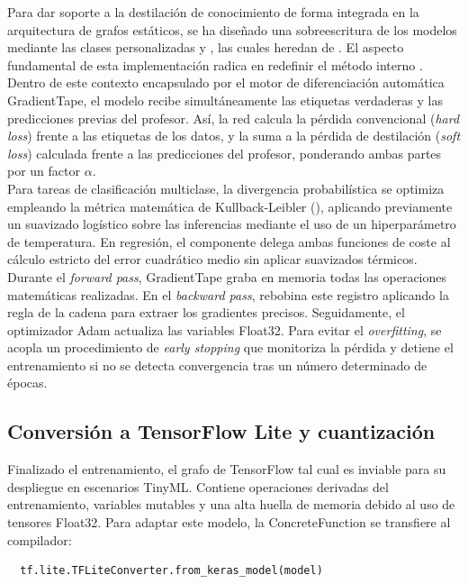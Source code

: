 \documentclass[a4paper,12pt,twoside,final]{book}
\begin{document}
Para dar soporte a la destilación de conocimiento de forma integrada en la arquitectura de grafos estáticos, se ha
diseñado una sobreescritura de los modelos mediante las clases personalizadas  y
, las cuales heredan de . El aspecto fundamental de esta implementación
radica en redefinir el método interno . Dentro de este contexto encapsulado por el motor de
diferenciación automática GradientTape, el modelo recibe simultáneamente las etiquetas verdaderas y las predicciones
previas del profesor. Así, la red calcula la pérdida convencional (\textit{hard loss}) frente a las etiquetas de los
datos, y la suma a la pérdida de destilación (\textit{soft loss}) calculada frente a las predicciones del profesor,
ponderando ambas partes por un factor $\alpha$.\\

Para tareas de clasificación multiclase, la divergencia probabilística se optimiza empleando la métrica matemática de
Kullback-Leibler (), aplicando previamente un suavizado logístico sobre las inferencias mediante el
uso de un hiperparámetro de temperatura. En regresión, el componente  delega ambas funciones de
coste al cálculo estricto del error cuadrático medio sin aplicar suavizados térmicos.\\

Durante el \textit{forward pass}, GradientTape graba en memoria todas las operaciones matemáticas realizadas. En el
\textit{backward pass}, rebobina este registro aplicando la regla de la cadena para extraer los gradientes precisos.
Seguidamente, el optimizador Adam actualiza las variables Float32. Para evitar el \textit{overfitting}, se acopla un
procedimiento de \textit{early stopping} que monitoriza la pérdida y detiene el entrenamiento si no se detecta
convergencia tras un número determinado de épocas.

\subsection{Conversión a TensorFlow Lite y cuantización}
Finalizado el entrenamiento, el grafo de TensorFlow tal cual es inviable para su despliegue en escenarios TinyML.
Contiene operaciones derivadas del entrenamiento, variables mutables y una alta huella de memoria debido al uso de
tensores Float32. Para adaptar este modelo, la ConcreteFunction se transfiere al compilador:
\begin{verbatim}
  tf.lite.TFLiteConverter.from_keras_model(model)
\end{verbatim}
\end{document}

